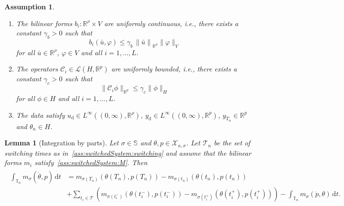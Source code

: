 \documentclass[10pt,a4paper]{amsart}
\newtheorem{assumption}{Assumption}
\newtheorem{lemma}{Lemma}
\newcommand{\Li}{\mathcal{L}}
\newcommand{\R}{\mathbb R}
\newcommand{\X}{{\mathscr X}}
\newcommand{\adState}{p}
\newcommand{\addSwitching}{\mathbb{S}}
\newcommand{\cOper}{\calC}
\newcommand{\calC}{\mathcal{C}}
\newcommand{\calT}{\mathcal{T}}
\newcommand{\contB}{\gamma_b}
\newcommand{\contC}{\gamma_c}
\newcommand{\desired}[1]{#1_{\mathrm{d}}}
\newcommand{\dt}{\,\mathrm{d}t}
\newcommand{\inpVar}{u}
\newcommand{\inpVarDes}{\desired{u}}
\newcommand{\inpVarDim}{\rho}
\newcommand{\nrModes}{L}
\newcommand{\outVarDes}{\desired{y}}
\newcommand{\outVarDim}{p}
\newcommand{\state}{\theta}
\newcommand{\switch}{\sigma}
\newcommand{\timeInt}{\mathbb{T}}
\begin{document}
\begin{assumption}
\begin{enumerate}
\begin{equation}
			\end{equation}			        
			for all  $\phi,\varphi\in H$ and all $i=1,\ldots,\nrModes$.
		\item\label{ass:switchedSystem:B} The bilinear forms $b_i\colon \R^{\inpVarDim}\times V$ are uniformly continuous, i.e., there exists a constant $\contB>0$ such that
          	\begin{equation}\nonumber
          		b_i(\bar{\inpVar},\varphi) \leq \contB\, {\|\bar{\inpVar}\|}_{\R^{\inpVarDim}}\|\varphi\|_{V}
          	\end{equation}
          	for all $\bar{\inpVar}\in\R^{\inpVarDim}$, $\varphi\in V$ and all $i=1,\ldots,\nrModes$.
		\item\label{ass:switchedSystem:C}The operators $\cOper_i\in\Li(H,\R^{\outVarDim})$ are uniformly bounded, i.e., there exists a constant $\contC>0$ such that
			\begin{equation}\nonumber
          		\|\cOper_i\phi\|_{\R^{\outVarDim}} \leq \contC \|\phi\|_H
          	\end{equation}
          	for all $\phi\in H$ and all $i=1,\ldots,\nrModes$.
        \item The data satisfy $\inpVarDes\in L^\infty((0,\infty),\R^{\inpVarDim})$, $\outVarDes\in L^\infty((0,\infty),\R^{\outVarDim})$, $y_{T_n}\in\R^{\outVarDim}$ and $\theta_n\in H$.
 	\end{enumerate}
\end{assumption}

\begin{lemma}[Integration by parts]\label{lemma:S-IBP}
    Let $\switch\in\addSwitching$ and $\state,\adState\in \X_{n,\switch}$. Let $\calT_n$ be the set of switching times as in \,\ref{ass:switchedSystem:switching} and assume that the bilinear forms $m_i$ satisfy \,\ref{ass:switchedSystem:M}. Then
    \begin{align}    \label{eqn:integrationByPartsM}
    \begin{aligned}
        \int_{\timeInt_n} m_{\switch}(\dot{\state},\adState)\dt &=  m_{\switch(T_n)}(\state(T_{n}),\adState(T_{n}))-m_{\switch(t_n)}(\state(t_{n}),\adState(t_{n}))\\
        &+\sum_{t_i\in \calT} \left(m_{\switch(t^-_i)}(\state(t^-_{i}),\adState(t^-_{i}))-m_{\switch(t^+_i)}(\state(t_{i}^+),\adState(t^+_{i}))\right) -\int_{\timeInt_n} m_{\switch}(\dot{\adState},\state)\dt .
        \end{aligned}
    \end{align}
\end{lemma}
\end{document}

